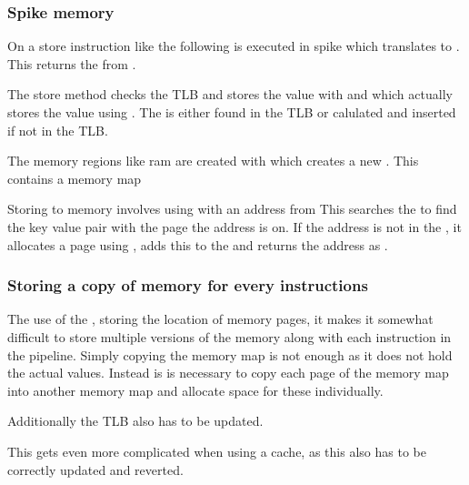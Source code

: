 \subsubsection{Spike memory}


On a store instruction like  the following is executed in spike  which translates to . This returns the  from .

The store method checks the TLB and stores the value with  and  which actually stores the value using . The  is either found in the TLB or calulated and inserted if not in the TLB. 


The memory regions like ram are created with 
which creates a new . This contains a memory map 

Storing to memory involves using  with an address from 
This searches the  to find the key value pair with the page the address is on. If the address is not in the , it allocates a page using , adds this to the  and returns the address as .

\subsubsection{Storing a copy of memory for every instructions}

The use of the , storing the location of memory pages, it makes it somewhat difficult to store multiple versions of the memory along with each instruction in the pipeline. Simply copying the memory map is not enough as it does not hold the actual values. Instead is is necessary to copy each page of the memory map into another memory map and allocate space for these individually. 

Additionally the TLB also has to be updated.

This gets even more complicated when using a cache, as this also has to be correctly updated and reverted. 


